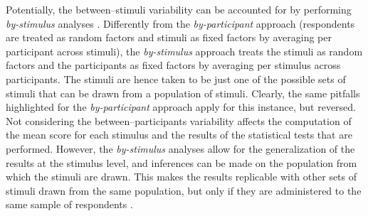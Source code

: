 \documentclass[12pt]{book}
\begin{document}

Potentially, the between--stimuli variability can be accounted for by performing \emph{by-stimulus} analyses \cite{judd2012}. 
Differently from the \emph{by-participant} approach (respondents are treated as random factors and stimuli as fixed factors by averaging per participant across stimuli), the \emph{by-stimulus} approach treats the stimuli as random factors and the participants as fixed factors by averaging per stimulus across participants. 
The stimuli are hence taken to be just one of the possible sets of stimuli that can be drawn from a population of stimuli. 
Clearly, the same pitfalls highlighted for the \emph{by-participant} approach apply for this instance, but reversed. 
Not considering the between--participants variability affects the computation of the mean score for each stimulus and the results of the statistical tests that are performed.  
However, the \emph{by-stimulus} analyses allow for the generalization of the results at the stimulus level, and  inferences can be made on the population from which the stimuli are drawn. This makes the results replicable with other sets of stimuli drawn from the same population, but only if they are administered to the same sample of respondents \cite{judd2012}. 
\end{document}
